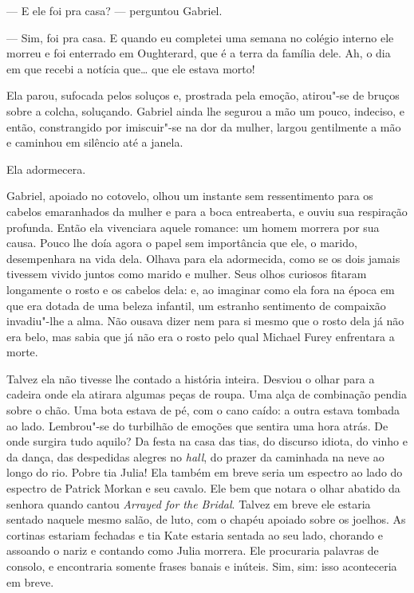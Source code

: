 --- E ele foi pra casa? --- perguntou Gabriel.

--- Sim, foi pra casa.  E quando eu completei uma semana no colégio interno ele
morreu e foi enterrado em Oughterard, que é a terra da família dele.  Ah, o dia
em que recebi a notícia que\ldots{} que ele estava morto!

Ela parou, sufocada pelos soluços e, prostrada pela emoção, atirou"-se de bruços
sobre a colcha, soluçando.  Gabriel ainda lhe segurou a mão um pouco, indeciso,
e então, constrangido por imiscuir"-se na dor da mulher, largou gentilmente a
mão e caminhou em silêncio até a janela.

\smallskip

\noindent\dotfill

\smallskip

Ela adormecera.

Gabriel, apoiado no cotovelo, olhou um instante sem ressentimento para os
cabelos emaranhados da mulher e para a boca entreaberta, e ouviu sua respiração
profunda.  Então ela vivenciara aquele romance: um homem morrera por sua causa.
Pouco lhe doía agora o papel sem importância que ele, o marido, desempenhara na
vida dela.  Olhava para ela adormecida, como se os dois jamais tivessem vivido
juntos como marido e mulher.  Seus olhos curiosos fitaram longamente o rosto e
os cabelos dela: e, ao imaginar como ela fora na época em que era dotada de uma
beleza infantil, um estranho sentimento de compaixão invadiu"-lhe a alma.  Não
ousava dizer nem para si mesmo que o rosto dela já não era belo, mas sabia que
já não era o rosto pelo qual Michael Furey enfrentara a morte.

Talvez ela não tivesse lhe contado a história inteira.  Desviou o olhar para a
cadeira onde ela atirara algumas peças de roupa.  Uma alça de combinação pendia
sobre o chão.  Uma bota estava de pé, com o cano caído: a outra estava tombada
ao lado.  Lembrou"-se do turbilhão de emoções que sentira uma hora atrás.  De
onde surgira tudo aquilo?  Da festa na casa das tias, do discurso idiota, do
vinho e da dança, das despedidas alegres no \textit{hall}, do prazer da
caminhada na neve ao longo do rio.  Pobre tia Julia!  Ela também em breve seria
um espectro ao lado do espectro de Patrick Morkan e seu cavalo.  Ele bem que
notara o olhar abatido da senhora quando cantou \textit{Arrayed for the
Bridal}.  Talvez em breve ele estaria sentado naquele mesmo salão, de luto, com
o chapéu apoiado sobre os joelhos.  As cortinas estariam fechadas e tia Kate
estaria sentada ao seu lado, chorando e assoando o nariz e contando como Julia
morrera.  Ele procuraria palavras de consolo, e encontraria somente frases
banais e inúteis.  Sim, sim: isso aconteceria em breve.

